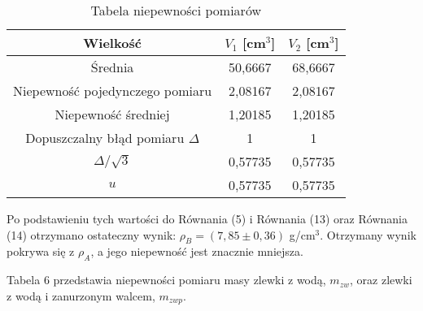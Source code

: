 \documentclass[10pt,a4paper]{article}
\begin{document}
 \begin{center}
 \begin{table}[h!]
 \label{5}
 \centering
 \caption{Tabela niepewności pomiarów }
 \begin{tabular}{|c|c|c|}
 \hline
 Wielkość &$V_{1}$ [cm$^{3}$] & $V_{2}$ [cm$^{3}$]  \\
 \hline
Średnia & 50,6667 &68,6667 \\
\hline
Niepewność pojedynczego pomiaru&2,08167&2,08167\\
\hline
Niepewność średniej&1,20185&1,20185\\
\hline
Dopuszczalny błąd pomiaru $\Delta$& 1&1\\
\hline
$\Delta / \sqrt{3}$&0,57735&0,57735\\
\hline
$u$&0,57735&0,57735\\
\hline
 \end{tabular}
 \end{table}
 \end{center}
Po podstawieniu tych wartości do Równania (5) i Równania (13) oraz Równania (14) otrzymano ostateczny wynik: $\rho_{B}=(7,85\pm0,36)$ g/cm$^{3}$. Otrzymany wynik pokrywa się z $\rho_{A}$, a jego niepewność jest znacznie mniejsza. 

Tabela 6 przedstawia niepewności pomiaru masy zlewki z wodą, $m_{zw}$, oraz zlewki z wodą i zanurzonym walcem, $m_{zwp}$.
 
\end{document}
